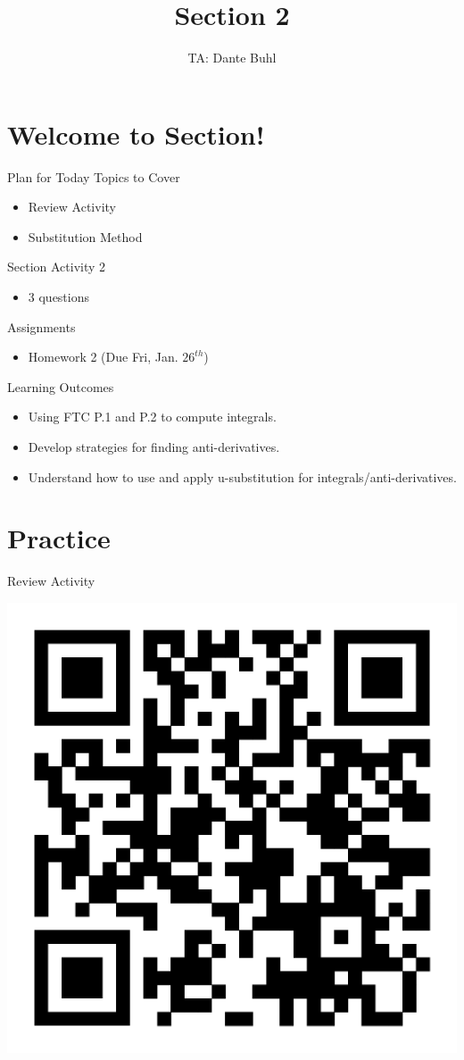 \documentclass{beamer}
\title{Section 2}
\author{TA: Dante Buhl}
\institute{UCSC Math-19B}
\begin{document}
\newcommand{\bmp}[1]{\begin{minipage}{#1\textwidth}}
\newcommand{\emp}{\end{minipage}}


\frame{\titlepage}

\section{Welcome to Section!}
\begin{frame}{Plan for Today}
    Topics to Cover
    \begin{itemize}
        \item Review Activity
        \item Substitution Method
    \end{itemize}
    Section Activity 2
    \begin{itemize}
        \item 3 questions
    \end{itemize}
    Assignments
    \begin{itemize}
        \item Homework 2 (Due Fri, Jan. $26^{th}$)
    \end{itemize}
\end{frame}



\begin{frame}{Learning Outcomes}
    \begin{itemize}
        \item Using FTC P.1 and P.2 to compute integrals.
        \item Develop strategies for finding anti-derivatives.
        \item Understand how to use and apply u-substitution for integrals/anti-derivatives.
    \end{itemize}
\end{frame}

\section{Practice}
\begin{frame}{Review Activity}

    \includegraphics[width=.6\textwidth]{activity.png}


\end{frame}
\end{document}
